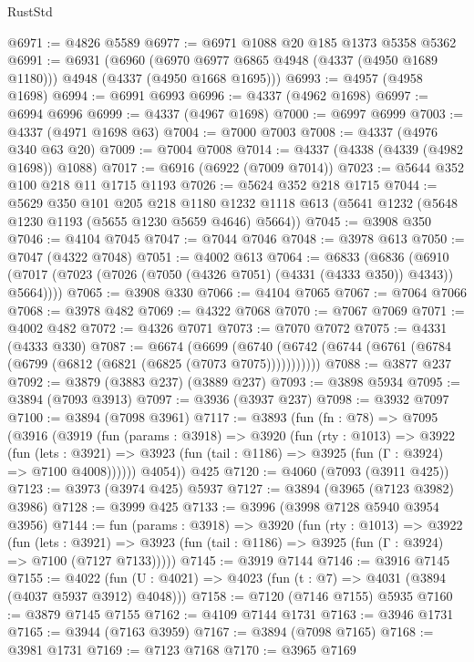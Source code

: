 \begin{lexlean}{RustStd}
\begin{coremodule}
{\begin{coremodule}
{{{{{{{{{{{{{{{{{{{{{{{{{{{{{{{{@6971 := @4826 @5589
@6977 := @6971 @1088 @20 @185 @1373 @5358 @5362
@6991 := @6931
    (@6960 (@6970 @6977 @6865 @4948 (@4337 (@4950 @1689 @1180))) @4948 (@4337 (@4950 @1668 @1695)))
@6993 := @4957 (@4958 @1698)
@6994 := @6991 @6993
@6996 := @4337 (@4962 @1698)
@6997 := @6994 @6996
@6999 := @4337 (@4967 @1698)
@7000 := @6997 @6999
@7003 := @4337 (@4971 @1698 @63)
@7004 := @7000 @7003
@7008 := @4337 (@4976 @340 @63 @20)
@7009 := @7004 @7008
@7014 := @4337 (@4338 (@4339 (@4982 @1698)) @1088)
@7017 := @6916 (@6922 (@7009 @7014))
@7023 := @5644 @352 @100 @218 @11 @1715 @1193
@7026 := @5624 @352 @218 @1715
@7044 := @5629
    @350
    @101
    @205
    @218
    @1180
    @1232
    @1118
    @613
    (@5641 @1232 (@5648 @1230 @1193 (@5655 @1230 @5659 @4646) @5664))
@7045 := @3908 @350
@7046 := @4104 @7045
@7047 := @7044 @7046
@7048 := @3978 @613
@7050 := @7047 (@4322 @7048)
@7051 := @4002 @613
@7064 := @6833
    (@6836 (@6910 (@7017 (@7023 (@7026 (@7050 (@4326 @7051) (@4331 (@4333 @350)) @4343)) @5664))))
@7065 := @3908 @330
@7066 := @4104 @7065
@7067 := @7064 @7066
@7068 := @3978 @482
@7069 := @4322 @7068
@7070 := @7067 @7069
@7071 := @4002 @482
@7072 := @4326 @7071
@7073 := @7070 @7072
@7075 := @4331 (@4333 @330)
@7087 := @6674
    (@6699 (@6740 (@6742 (@6744 (@6761 (@6784 (@6799 (@6812 (@6821 (@6825 (@7073 @7075)))))))))))
@7088 := @3877 @237
@7092 := @3879 (@3883 @237) (@3889 @237)
@7093 := @3898 @5934
@7095 := @3894 (@7093 @3913)
@7097 := @3936 (@3937 @237)
@7098 := @3932 @7097
@7100 := @3894 (@7098 @3961)
@7117 := @3893
    (fun (fn : @78) =>
    @7095
      (@3916
        (@3919
          (fun (params : @3918) =>
          @3920
            (fun (rty : @1013) =>
            @3922
              (fun (lets : @3921) =>
              @3923 (fun (tail : @1186) => @3925 (fun (Γ : @3924) => @7100 @4008))))))
        @4054))
    @425
@7120 := @4060 (@7093 (@3911 @425))
@7123 := @3973 (@3974 @425) @5937
@7127 := @3894 (@3965 (@7123 @3982) @3986)
@7128 := @3999 @425
@7133 := @3996 (@3998 @7128 @5940 @3954 @3956)
@7144 := fun (params : @3918) =>
  @3920
    (fun (rty : @1013) =>
    @3922
      (fun (lets : @3921) =>
      @3923 (fun (tail : @1186) => @3925 (fun (Γ : @3924) => @7100 (@7127 @7133)))))
@7145 := @3919 @7144
@7146 := @3916 @7145
@7155 := @4022 (fun (U : @4021) => @4023 (fun (t : @7) => @4031 (@3894 (@4037 @5937 @3912) @4048)))
@7158 := @7120 (@7146 @7155) @5935
@7160 := @3879 @7145 @7155
@7162 := @4109 @7144 @1731
@7163 := @3946 @1731
@7165 := @3944 (@7163 @3959)
@7167 := @3894 (@7098 @7165)
@7168 := @3981 @1731
@7169 := @7123 @7168
@7170 := @3965 @7169
}}}}}}}}}}}}}}}}}}}}}}}}}}}}}}}}
\end{coremodule}}
\end{coremodule}
\end{lexlean}
